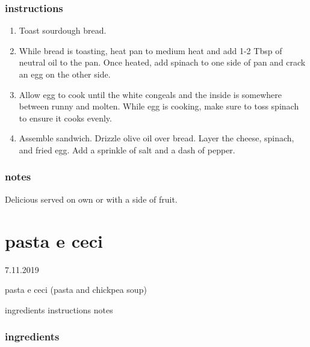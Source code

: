 \documentclass[]{book}
\providecommand{\tightlist}{%
  \setlength{\itemsep}{0pt}\setlength{\parskip}{0pt}}
\begin{document}
\hypertarget{instructions-12}{%
\subsection{instructions}\label{instructions-12}}

\begin{enumerate}
\def\labelenumi{\arabic{enumi}.}
\tightlist
\item
  Toast sourdough bread.
\item
  While bread is toasting, heat pan to medium heat and add 1-2 Tbsp of neutral oil to the pan. Once heated, add
  spinach to one side of pan and crack an egg on the other side.
\item
  Allow egg to cook until the white congeals and the inside is somewhere between runny and molten. While egg is
  cooking, make sure to toss spinach to ensure it cooks evenly.
\item
  Assemble sandwich. Drizzle olive oil over bread. Layer the cheese, spinach, and fried egg. Add a sprinkle of salt
  and a dash of pepper.
\end{enumerate}

\hypertarget{notes-12}{%
\subsection{notes}\label{notes-12}}

Delicious served on own or with a side of fruit.

\hypertarget{pasta-e-ceci}{%
\chapter{pasta e ceci}\label{pasta-e-ceci}}

7.11.2019

pasta e ceci (pasta and chickpea soup)

ingredients \textbar{}
instructions \textbar{}
notes

\hypertarget{ingredients-13}{%
\subsection{ingredients}\label{ingredients-13}}
\end{document}
